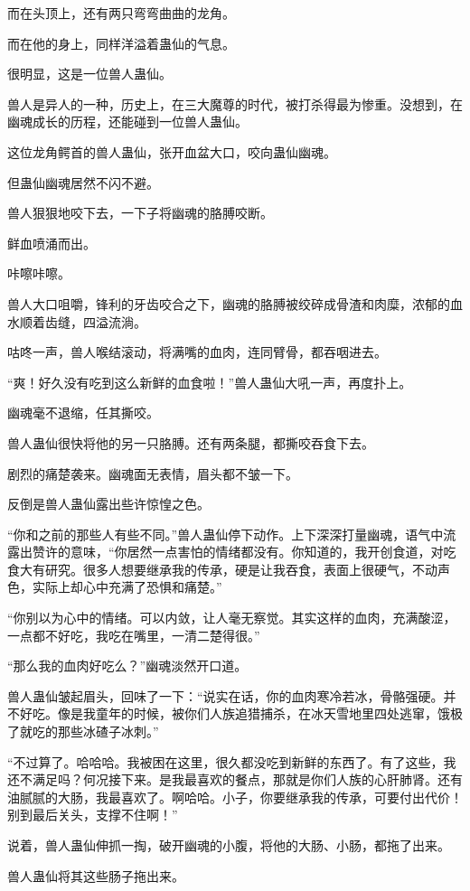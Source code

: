 \begin{this_body}
而在头顶上，还有两只弯弯曲曲的龙角。

而在他的身上，同样洋溢着蛊仙的气息。

很明显，这是一位兽人蛊仙。

兽人是异人的一种，历史上，在三大魔尊的时代，被打杀得最为惨重。没想到，在幽魂成长的历程，还能碰到一位兽人蛊仙。

这位龙角鳄首的兽人蛊仙，张开血盆大口，咬向蛊仙幽魂。

但蛊仙幽魂居然不闪不避。

兽人狠狠地咬下去，一下子将幽魂的胳膊咬断。

鲜血喷涌而出。

咔嚓咔嚓。

兽人大口咀嚼，锋利的牙齿咬合之下，幽魂的胳膊被绞碎成骨渣和肉糜，浓郁的血水顺着齿缝，四溢流淌。

咕咚一声，兽人喉结滚动，将满嘴的血肉，连同臂骨，都吞咽进去。

“爽！好久没有吃到这么新鲜的血食啦！”兽人蛊仙大吼一声，再度扑上。

幽魂毫不退缩，任其撕咬。

兽人蛊仙很快将他的另一只胳膊。还有两条腿，都撕咬吞食下去。

剧烈的痛楚袭来。幽魂面无表情，眉头都不皱一下。

反倒是兽人蛊仙露出些许惊惶之色。

“你和之前的那些人有些不同。”兽人蛊仙停下动作。上下深深打量幽魂，语气中流露出赞许的意味，“你居然一点害怕的情绪都没有。你知道的，我开创食道，对吃食大有研究。很多人想要继承我的传承，硬是让我吞食，表面上很硬气，不动声色，实际上却心中充满了恐惧和痛楚。”

“你别以为心中的情绪。可以内敛，让人毫无察觉。其实这样的血肉，充满酸涩，一点都不好吃，我吃在嘴里，一清二楚得很。”

“那么我的血肉好吃么？”幽魂淡然开口道。

兽人蛊仙皱起眉头，回味了一下：“说实在话，你的血肉寒冷若冰，骨骼强硬。并不好吃。像是我童年的时候，被你们人族追猎捕杀，在冰天雪地里四处逃窜，饿极了就吃的那些冰碴子冰刺。”

“不过算了。哈哈哈。我被困在这里，很久都没吃到新鲜的东西了。有了这些，我还不满足吗？何况接下来。是我最喜欢的餐点，那就是你们人族的心肝肺肾。还有油腻腻的大肠，我最喜欢了。啊哈哈。小子，你要继承我的传承，可要付出代价！别到最后关头，支撑不住啊！”

说着，兽人蛊仙伸抓一掏，破开幽魂的小腹，将他的大肠、小肠，都拖了出来。

兽人蛊仙将其这些肠子拖出来。


\end{this_body}
